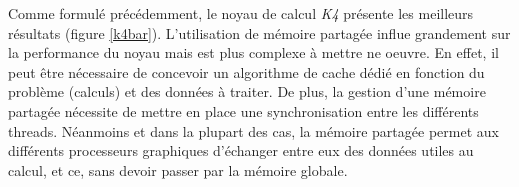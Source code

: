 \documentclass[11pt, twocolumn]{article}
\begin{document}
Comme formulé précédemment, le noyau de calcul \textit{K4}
présente les meilleurs résultats (figure \ref{k4bar}).
L'utilisation de mémoire
partagée influe grandement sur la performance du noyau 
mais est plus complexe à mettre ne oeuvre. En effet, il 
peut être nécessaire de concevoir un algorithme de cache 
dédié en fonction du problème (calculs) et des données à
traiter. De plus, la gestion d'une mémoire partagée 
nécessite de mettre en place une synchronisation entre les 
différents threads. Néanmoins et dans la plupart des cas,
la mémoire partagée permet aux différents processeurs graphiques
d'échanger entre eux des données utiles au calcul, et ce, sans
devoir passer par la mémoire globale.

\newcommand*{\MinNumber}{18.2}
\newcommand*{\MidNumber}{83.21}
\newcommand*{\MaxNumber}{166.42}

\newcommand{\ApplyGradient}[1]{
    \IfInteger{#1}{
        #1
    }{
        \ifdim #1 pt > 0 pt
            \ifdim #1 pt > \MidNumber pt
                \pgfmathsetmacro{\PercentColor}{max(min(100.0*(#1 - \MidNumber)/(\MaxNumber-\MidNumber),100.0),0.00)} %
                \hspace{-0.33em}\colorbox{green!\PercentColor!yellow}{#1}
            \else
                \pgfmathsetmacro{\PercentColor}{max(min(100.0*(\MidNumber - #1)/(\MidNumber-\MinNumber),100.0),0.00)} %
                \hspace{-0.33em}\colorbox{red!\PercentColor!yellow}{#1}
            \fi
        \else
            \hspace{-0.33em}{}
        \fi
    }
}

\setlength{\tabcolsep}{0pt}
\end{document}
